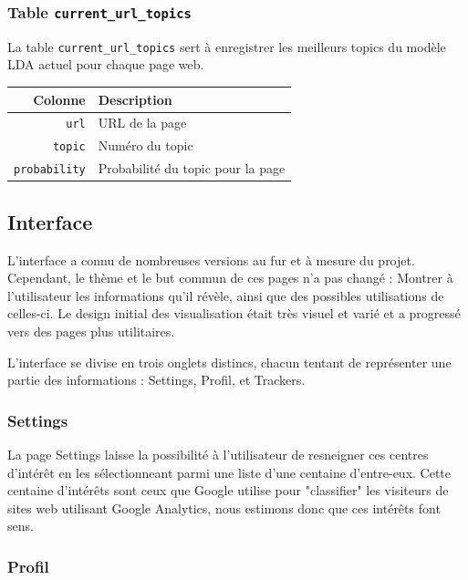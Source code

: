 		\subsubsection{Table \texttt{current\_url\_topics}}\label{table-current-url-topics}
			La table \texttt{current\_url\_topics} sert à enregistrer les meilleurs topics du modèle LDA actuel pour chaque page web.

			\begin{tabular}{rl}
				\textbf{Colonne} & \textbf{Description} \\
				\hline
				\texttt{url} & URL de la page \\
			    \texttt{topic} & Numéro du topic \\
			    \texttt{probability} & Probabilité du topic pour la page \\
			\end{tabular}
		

	\FloatBarrier

	\subsection{Interface}

		L'interface a connu de nombreuses versions au fur et à mesure du projet. Cependant, le thème et le but commun de ces pages n'a pas changé : Montrer à l'utilisateur les informations qu'il révèle, ainsi que des possibles utilisations de celles-ci. Le design initial des visualisation était très visuel et varié et a progressé vers des pages plus utilitaires.

		L'interface se divise en trois onglets distincs, chacun tentant de représenter une partie des informations : Settings, Profil, et Trackers.

		\subsubsection{Settings}

			La page Settings laisse la possibilité à l'utilisateur de resneigner ces centres d'intérêt en les sélectionneant parmi une liste d'une centaine d'entre-eux. Cette centaine d'intérêts sont ceux que Google utilise pour "classifier" les visiteurs de sites web utilisant Google Analytics, nous estimons donc que ces intérêts font sens. 

		\subsubsection{Profil}

